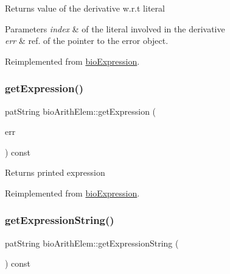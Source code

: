 \begin{DoxyReturn}{Returns}
value of the derivative w.\+r.\+t literal 
\end{DoxyReturn}

\begin{DoxyParams}{Parameters}
{\em index} & of the literal involved in the derivative \\
\hline
{\em err} & ref. of the pointer to the error object. \\
\hline
\end{DoxyParams}


Reimplemented from \hyperlink{classbio_expression_a5915579d1193f25f216c1e273c97f2ce}{bio\+Expression}.

\mbox{\label{classbio_arith_elem_a729f5a91619948fa58f7b4902741a2f4}} 
\subsubsection{\texorpdfstring{get\+Expression()}{getExpression()}}
{\footnotesize\ttfamily pat\+String bio\+Arith\+Elem\+::get\+Expression (\begin{DoxyParamCaption}\item[{pat\+Error $\ast$\&}]{err }\end{DoxyParamCaption}) const\hspace{0.3cm}{\ttfamily [virtual]}}

\begin{DoxyReturn}{Returns}
printed expression 
\end{DoxyReturn}


Reimplemented from \hyperlink{classbio_expression_a66a83eb0caac18dd5e568ffde5a8b5d4}{bio\+Expression}.

\mbox{\label{classbio_arith_elem_a0ea23c1cc50f06dec01ba195392c8417}} 
\subsubsection{\texorpdfstring{get\+Expression\+String()}{getExpressionString()}}
{\footnotesize\ttfamily pat\+String bio\+Arith\+Elem\+::get\+Expression\+String (\begin{DoxyParamCaption}{ }\end{DoxyParamCaption}) const\hspace{0.3cm}{\ttfamily [virtual]}}


